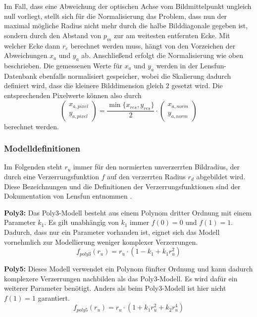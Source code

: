 Im Fall, dass eine Abweichung der optischen Achse vom Bildmittelpunkt ungleich null vorliegt, stellt sich für die Normalisierung das Problem, dass nun der maximal mögliche Radius nicht mehr durch die halbe Bilddiagonale gegeben ist, sondern durch den Abstand von $p_m$ zur am weitesten entfernten Ecke. Mit welcher Ecke dann $r_e$ berechnet werden muss, hängt von den Vorzeichen der Abweichungen $x_{a}$ und $y_{a}$ ab. Anschließend erfolgt die Normalisierung wie oben beschrieben. Die gemessenen Werte für $x_{a}$ und $y_{a}$ werden in der Lensfun-Datenbank ebenfalls normalisiert gespeicher, wobei die Skalierung dadurch definiert wird, dass die kleinere Bilddimension gleich 2 gesetzt wird. Die entsprechenden Pixelwerte können also durch
\begin{equation}
\begin{pmatrix}
x_{a,pixel} \\ y_{a,pixel}
\end{pmatrix}
 = \frac{\min\{x_{res}, y_{res}\}}{2} \cdot
 \begin{pmatrix}
 x_{a,norm} \\ y_{a,norm}
 \end{pmatrix}
\end{equation} 
berechnet werden.

\newpage
\subsubsection{Modelldefinitionen}\label{sec:Modeldefinitions}
\label{subsubsec:modeldef}

Im Folgenden steht $r_u$ immer für den normierten unverzerrten Bildradius, der durch eine Verzerrungsfunktion $f$ auf den verzerrten Radius $r_d$ abgebildet wird. Diese Bezeichnungen und die Definitionen der Verzerrungsfunktionen sind der Dokumentation von Lensfun entnommen \cite{lensfun}.

\textbf{Poly3:} Das Poly3-Modell besteht aus einem Polynom dritter Ordnung mit einem Parameter $k_1$. Es gilt unabhängig von $k_1$ immer $f(0) = 0$ und $f(1) = 1$. Dadurch, dass nur ein Parameter vorhanden ist, eignet sich das Modell vornehmlich zur Modellierung weniger komplexer Verzerrungen.
\begin{equation}
	f_{poly3}(r_u) = r_u \cdot (1 - k_1 + k_1 r_u^2)
\end{equation}

\textbf{Poly5:} Dieses Modell verwendet ein Polynom fünfter Ordnung und kann dadurch komplexere Verzerrungen nachbilden als das Poly3-Modell. Es wird dafür ein weiterer Parameter benötigt. Anders als beim Poly3-Modell ist hier nicht $f(1) = 1$ garantiert.
\begin{equation}
	f_{poly5}(r_u) = r_u \cdot (1 + k_1 r_u^2 + k_2 r_u^4)
\end{equation}

